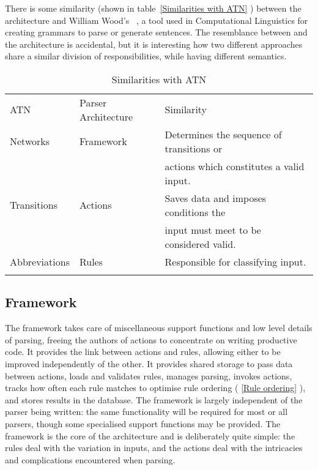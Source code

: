 \documentclass{svmult}
\newcommand{\tabletopline}[0]{%
    \hline%
    \noalign{\smallskip}%
}
\newcommand{\tablebottomline}[0]{%
    \noalign{\smallskip}%
    \hline%
}
\newcommand{\tablemiddleline}[0]{%
    \noalign{\smallskip}%
    \hline%
    \noalign{\smallskip}%
}
\newcommand{\sectionref}[1]{%
    \textsection{}\vref*{#1}%
}
\newcommand{\refwithlabel}[2]{%
    #1~\vref{#2}%
}
\newcommand{\tableref}[1]{%
    \refwithlabel{table}{#1}%
}
\begin{document}
There is some similarity (shown in \tableref{Similarities with ATN})
between the architecture and William Wood's \ATN{}~\cite{atns, nlpip}, a
tool used in Computational Linguistics for creating grammars to parse or
generate sentences.  The resemblance between \ATN{} and the architecture is
accidental, but it is interesting how two different approaches share a
similar division of responsibilities, while having different semantics.


\begin{table}[hbtp]
    \caption{Similarities with ATN}\label{Similarities with ATN}
    \begin{tabular}[]{lll}
        \tabletopline{}%
        ATN           & Parser Architecture & Similarity                                \\
        \tablemiddleline{}%
        Networks      & Framework           & Determines the sequence of transitions or \\
                      &                     & actions which constitutes a valid input.  \\
        Transitions   & Actions             & Saves data and imposes conditions the     \\
                      &                     & input must meet to be considered valid.   \\
        Abbreviations & Rules               & Responsible for classifying input.        \\
        \tablebottomline{}%
    \end{tabular}
\end{table}

\subsection{Framework}

\label{Framework}

The framework takes care of miscellaneous support functions and low level
details of parsing, freeing the authors of actions to concentrate on
writing productive code.  It provides the link between actions and rules,
allowing either to be improved independently of the other.  It provides
shared storage to pass data between actions, loads and validates rules,
manages parsing, invokes actions, tracks how often each rule matches to
optimise rule ordering (\sectionref{Rule ordering}), and stores results in
the database.  The framework is largely independent of the parser being
written: the same functionality will be required for most or all parsers,
though some specialised support functions may be provided.  The framework
is the core of the architecture and is deliberately quite simple: the rules
deal with the variation in inputs, and the actions deal with the
intricacies and complications encountered when parsing.
\end{document}
